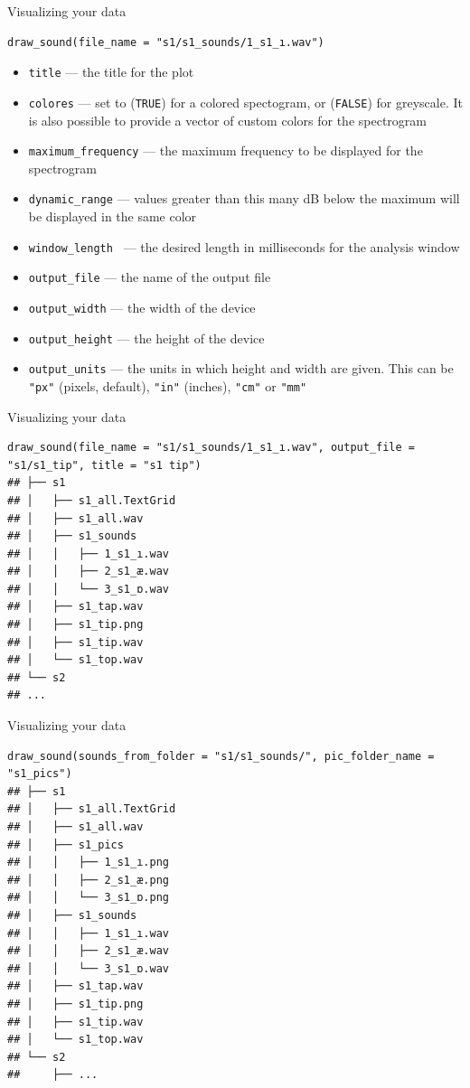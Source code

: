 \documentclass[13pt, t]{beamer}
\begin{document}
\begin{frame}[fragile]{Visualizing your data}
\begin{verbatim}
draw_sound(file_name = "s1/s1_sounds/1_s1_ı.wav")
\end{verbatim}
\begin{itemize}
\item \texttt{title} --- the title for the plot
\item \texttt{colores} --- set to (\texttt{TRUE}) for a colored spectogram, or (\texttt{FALSE}) for greyscale. It is also possible to provide a vector of custom colors for the spectrogram
\item \texttt{maximum\_frequency} --- the maximum frequency to be displayed for the spectrogram
\item \texttt{dynamic\_range} --- values greater than this many dB below the maximum will be displayed in the same color
\item \texttt{window\_length } --- the desired length in milliseconds for the analysis window
\item \texttt{output\_file} --- the name of the output file
\item \texttt{output\_width} --- the width of the device
\item \texttt{output\_height} --- the height of the device
\item \texttt{output\_units} --- the units in which height and width are given. This can be \texttt{"px"} (pixels, default), \texttt{"in"} (inches), \texttt{"cm"} or \texttt{"mm"}
\end{itemize}
\end{frame}

\begin{frame}[fragile]{Visualizing your data}
\begin{verbatim}
draw_sound(file_name = "s1/s1_sounds/1_s1_ı.wav", output_file = "s1/s1_tip", title = "s1 tip")
## ├── s1
## │   ├── s1_all.TextGrid
## │   ├── s1_all.wav
## │   ├── s1_sounds
## │   │   ├── 1_s1_ı.wav
## │   │   ├── 2_s1_æ.wav
## │   │   └── 3_s1_ɒ.wav
## │   ├── s1_tap.wav
## │   ├── s1_tip.png
## │   ├── s1_tip.wav
## │   └── s1_top.wav
## └── s2
## ...
\end{verbatim}
\end{frame}

\begin{frame}[fragile]{Visualizing your data}
\begin{verbatim}
draw_sound(sounds_from_folder = "s1/s1_sounds/", pic_folder_name = "s1_pics")
## ├── s1
## │   ├── s1_all.TextGrid
## │   ├── s1_all.wav
## │   ├── s1_pics
## │   │   ├── 1_s1_ı.png
## │   │   ├── 2_s1_æ.png
## │   │   └── 3_s1_ɒ.png
## │   ├── s1_sounds
## │   │   ├── 1_s1_ı.wav
## │   │   ├── 2_s1_æ.wav
## │   │   └── 3_s1_ɒ.wav
## │   ├── s1_tap.wav
## │   ├── s1_tip.png
## │   ├── s1_tip.wav
## │   └── s1_top.wav
## └── s2
##     ├── ...
\end{verbatim}
\end{frame}
\end{document}
